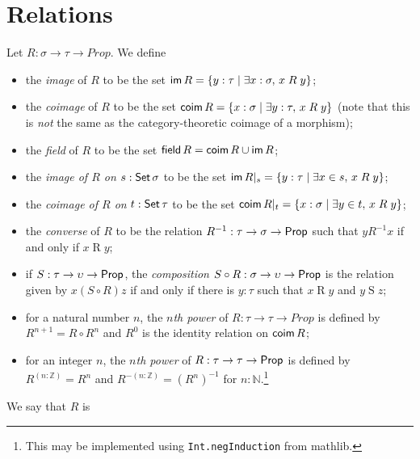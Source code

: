 \section{Relations}

\begin{definition-no-bp}
  \label{def:relation_props}
  Let \( R : \sigma \to \tau \to Prop \).
  We define
  \begin{itemize}
    \item the \emph{image} of \( R \) to be the set \( \operatorname{\mathsf{im}} R = \{ y : \tau \mid \exists x : \sigma,\, x \mathrel{R} y \} \);
    \item the \emph{coimage} of \( R \) to be the set \( \operatorname{\mathsf{coim}} R = \{ x : \sigma \mid \exists y : \tau,\, x \mathrel{R} y \} \) (note that this is \emph{not} the same as the category-theoretic coimage of a morphism);
    \item the \emph{field} of \( R \) to be the set \( \operatorname{\mathsf{field}} R = \operatorname{\mathsf{coim}} R \cup \operatorname{\mathsf{im}} R \);
    \item the \emph{image of \( R \) on} \( s : \operatorname{\mathsf{Set}} \sigma \) to be the set \( \operatorname{\mathsf{im}} R|_s = \{ y : \tau \mid \exists x \in s,\, x \mathrel{R} y \} \);
    \item the \emph{coimage of \( R \) on} \( t : \operatorname{\mathsf{Set}} \tau \) to be the set \( \operatorname{\mathsf{coim}} R|_t = \{ x : \sigma \mid \exists y \in t,\, x \mathrel{R} y \} \);
    \item the \emph{converse} of \( R \) to be the relation \( R^{-1} : \tau \to \sigma \to \mathsf{Prop} \) such that \( y \mathrel{R^{-1}} x \) if and only if \( x \mathrel{R} y \);
    \item if \( S : \tau \to \upsilon \to \mathsf{Prop} \), the \emph{composition} \( S \circ R : \sigma \to \upsilon \to \mathsf{Prop} \) is the relation given by \( x \mathrel{(S\circ R)} z \) if and only if there is \( y : \tau \) such that \( x \mathrel{R} y \) and \( y \mathrel{S} z \);
    \item for a natural number \( n \), the \emph{\( n \)th power} of \( R : \tau \to \tau \to Prop \) is defined by \( R^{n+1} = R \circ R^n \) and \( R^0 \) is the identity relation on \( \operatorname{\mathsf{coim}} R \);
    \item for an integer \( n \), the \emph{\( n \)th power} of \( R : \tau \to \tau \to \mathsf{Prop} \) is defined by \( R^{(n : \mathbb Z)} = R^n \) and \( R^{-(n : \mathbb Z)} = (R^n)^{-1} \) for \( n : \mathbb N \).\footnote{This may be implemented using \texttt{Int.negInduction} from mathlib.}
  \end{itemize}
  We say that \( R \) is
  \begin{itemize}

\end{itemize}
\end{definition-no-bp}
